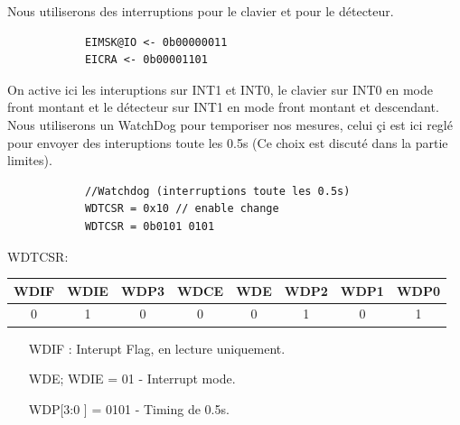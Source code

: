 \documentclass[a4paper, 12pt]{article}
\begin{document}
		Nous utiliserons des interruptions pour le clavier et pour le détecteur.
		\begin{lstlisting}
			EIMSK@IO <- 0b00000011
			EICRA <- 0b00001101 
		\end{lstlisting}
		On active ici les interuptions sur INT1 et INT0, le clavier sur INT0 en mode front montant et le détecteur sur INT1 en mode front montant et descendant.\\
		
		Nous utiliserons un WatchDog pour temporiser nos mesures, celui çi est ici reglé pour envoyer des interuptions toute les 0.5s (Ce choix est discuté dans la partie limites).
		\begin{lstlisting}
			//Watchdog (interruptions toute les 0.5s)
			WDTCSR = 0x10 // enable change
			WDTCSR = 0b0101 0101
		\end{lstlisting}
		WDTCSR:
		\begin{center}
			\begin{tabular}{|c|c|c|c|c|c|c|c|}
				\hline
				WDIF & WDIE & WDP3 & WDCE & WDE & WDP2 & WDP1 & WDP0\\
				\hline
				0 & 1 & 0 & 0 & 0 & 1 & 0 & 1\\
				\hline
			\end{tabular}
		\end{center}
		\begin{itemize}
			\item[WDIF] : Interupt Flag, en lecture uniquement.
			\item[WDE; WDIE] = 01 - Interrupt mode.
			\item[WDP[3:0]] = 0101 - Timing de 0.5s.
		\end{itemize}
\end{document}
